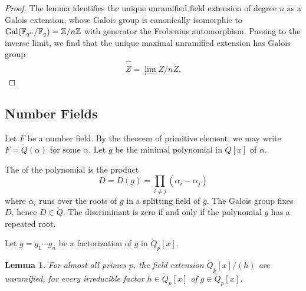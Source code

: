 \documentclass{amsart}
\newtheorem{lemma}[equation]{Lemma}
\begin{document}
\begin{proof} The lemma identifies the unique unramified field
  extension of degree $n$ as a Galois extension, whose Galois group is
  canonically isomorphic to ${\operatorname{Gal}}(\mathbb{F}_{q^n}/\mathbb{F}_q) =
  \mathbb{Z}/n\mathbb{Z}$ with generator the Frobenius automorphism.
  Passing to the inverse limit, we find that the unique maximal
  unramified extension has Galois group
\[
\hat{\ring{Z}} = \lim_{\leftarrow} \ring{Z}/n\ring{Z}.
\]
\end{proof}


\subsection{Number Fields}

Let $F$ be a number field. By the theorem of
primitive element, we may write $F = \ring{Q}(\alpha)$ for some
$\alpha$.  Let $g$ be the minimal polynomial in $\ring{Q}[x]$ of
$\alpha$.

The  of the polynomial is the product
\[
D = D(g) = \prod_{i\ne j} (\alpha_i-\alpha_j)
\]
where $\alpha_i$ runs over the roots of $g$ in a splitting field of
$g$.  The Galois group fixes $D$, hence $D\in\ring{Q}$.  The
discriminant is zero if and only if the polynomial $g$ has a repeated
root.

Let $g=g_1\cdots g_n$ be a factorization of $g$ in $\ring{Q}_p[x]$.

\begin{lemma} 
  For almost all primes $p$, the field extension $\ring{Q}_p[x]/(h)$
  are unramified, for every irreducible factor $h\in\ring{Q}_p[x]$ of
  $g\in\ring{Q}_p[x]$.
\end{lemma}
\end{document}
